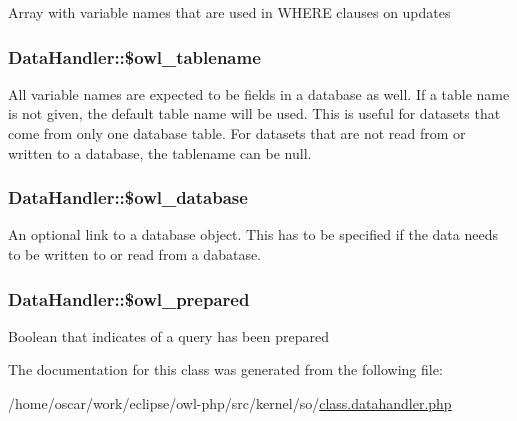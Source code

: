 Array with variable names that are used in WHERE clauses on updates \hypertarget{classDataHandler_24620784bde262bdd02227962d3b9605}{
\subsubsection{\setlength{\rightskip}{0pt plus 5cm}DataHandler::\$owl\_\-tablename}}
\label{classDataHandler_24620784bde262bdd02227962d3b9605}


All variable names are expected to be fields in a database as well. If a table name is not given, the default table name will be used. This is useful for datasets that come from only one database table. For datasets that are not read from or written to a database, the tablename can be null. \hypertarget{classDataHandler_3ac49aa018e0ebe4c74f5a636d455a8b}{
\subsubsection{\setlength{\rightskip}{0pt plus 5cm}DataHandler::\$owl\_\-database}}
\label{classDataHandler_3ac49aa018e0ebe4c74f5a636d455a8b}


An optional link to a database object. This has to be specified if the data needs to be written to or read from a dabatase. \hypertarget{classDataHandler_e6093d21291ed3ab3183e11962452928}{
\subsubsection{\setlength{\rightskip}{0pt plus 5cm}DataHandler::\$owl\_\-prepared}}
\label{classDataHandler_e6093d21291ed3ab3183e11962452928}


Boolean that indicates of a query has been prepared 

The documentation for this class was generated from the following file:\begin{CompactItemize}
\item 
/home/oscar/work/eclipse/owl-php/src/kernel/so/\hyperlink{class_8datahandler_8php}{class.datahandler.php}\end{CompactItemize}
